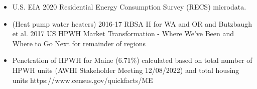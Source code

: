 \begin{itemize}
\item U.S. EIA 2020 Residential Energy Consumption Survey (RECS) microdata.
\item (Heat pump water heaters) 2016-17 RBSA II for WA and OR and Butzbaugh et al. 2017 US HPWH Market Transformation - Where We've Been and Where to Go Next for remainder of regions
\item Penetration of HPWH for Maine (6.71\%) calculated based on total number of HPWH units (AWHI Stakeholder Meeting 12/08/2022) and total housing units https://www.census.gov/quickfacts/ME
\end{itemize}
